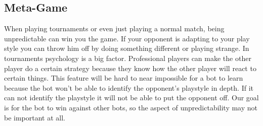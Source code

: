 \subsection{Meta-Game}		
		When playing tournaments or even just playing a normal match, being unpredictable can win you the game. 
		If your opponent is adapting to your play style you can throw him off by doing something different or playing strange.
		In tournaments psychology is a big factor. Professional players can make the other player do a certain strategy because they know 
		how the other player will react to certain things. This feature will be hard to near impossible for a bot to learn because the bot won't be able to 
		identify the opponent's playstyle in depth. 
		If it can not identify the playstyle it will not be able to put the opponent off. Our goal is for the bot 
		to win against other bots, so the aspect of unpredictability may not be important at all. 
